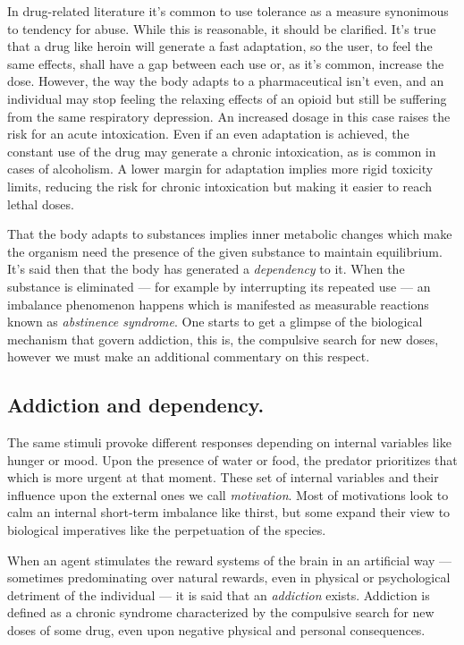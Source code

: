 In drug-related literature it's common to use tolerance as a measure synonimous to tendency for abuse. While this is reasonable, it should be clarified. It's true that a drug like heroin will generate a fast adaptation, so the user, to feel the same effects, shall have a gap between each use or, as it's common, increase the dose. However, the way the body adapts to a pharmaceutical isn't even, and an individual may stop feeling the relaxing effects of an opioid but still be suffering from the same respiratory depression. An increased dosage in this case raises the risk for an acute intoxication. Even if an even adaptation is achieved, the constant use of the drug may generate a chronic intoxication, as is common in cases of alcoholism. A lower margin for adaptation implies more rigid toxicity limits, reducing the risk for chronic intoxication but making it easier to reach lethal doses.

That the body adapts to substances implies inner metabolic changes which make the organism need the presence of the given substance to maintain equilibrium. It's said then that the body has generated a \textit{dependency} to it. When the substance is eliminated --- for example by interrupting its repeated use --- an imbalance phenomenon happens which is manifested as measurable reactions known as \textit{abstinence syndrome}. One starts to get a glimpse of the biological mechanism that govern addiction, this is, the compulsive search for new doses, however we must make an additional commentary on this respect.

\newpage

\subsection{Addiction and dependency.}

The same stimuli provoke different responses depending on internal variables like hunger or mood. Upon the presence of water or food, the predator prioritizes that which is more urgent at that moment. These set of internal variables and their influence upon the external ones we call \textit{motivation}. Most of motivations look to calm an internal short-term imbalance like thirst, but some expand their view to biological imperatives like the perpetuation of the species.

When an agent stimulates the reward systems of the brain in an artificial way --- sometimes predominating over natural rewards, even in physical or psychological detriment of the individual --- it is said that an \textit{addiction} exists. Addiction is defined as a chronic syndrome characterized by the compulsive search for new doses of some drug, even upon negative physical and personal consequences.

